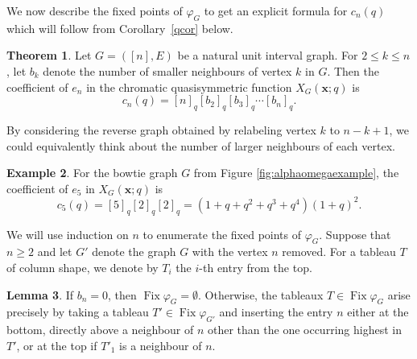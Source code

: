 \documentclass[10pt,a4paper]{amsart}
\theoremstyle{definition}
\newtheorem{theorem}{Theorem}[section]
\newtheorem{lemma}[theorem]{Lemma}
\newtheorem{example}[theorem]{Example}
\theoremstyle{remark}
\numberwithin{equation}{section}
\DeclareMathOperator{\Fix}{Fix}
\begin{document}
We now describe the fixed points of $\varphi_G$ to get an explicit formula for $c_n(q)$ which will follow from Corollary~\ref{qcor} below.


\begin{theorem}\label{thm:coefen}
Let $G=([n],E)$ be a natural unit interval graph. For $2\leq k\leq n$, let $b_k$ denote the number of smaller neighbours of vertex $k$ in $G$. Then the coefficient of $e_n$ in the chromatic quasisymmetric function $X_G(\bm x;q)$ is 
\begin{equation}
c_n(q)=[n]_q[b_2]_q[b_3]_q\cdots[b_n]_q.
\end{equation}
\end{theorem}

By considering the reverse graph obtained by relabeling vertex $k$ to $n-k+1$, we could equivalently think about the number of larger neighbours of each vertex. 

\begin{example}
For the bowtie graph $G$ from Figure \ref{fig:alphaomegaexample}, the coefficient of $e_5$ in $X_G(\bm x;q)$ is \begin{equation}
c_5(q)=[5]_q[2]_q[2]_q=(1+q+q^2+q^3+q^4)(1+q)^2.
\end{equation}
\end{example}

We will use induction on $n$ to enumerate the fixed points of $\varphi_G$. Suppose that $n\geq 2$ and let $G'$ denote the graph $G$ with the vertex $n$ removed. For a tableau $T$ of column shape, we denote by $T_i$ the $i$-th entry from the top.

\begin{lemma}\label{lem:fixind}
If $b_n=0$, then $\Fix\varphi_G=\emptyset$. Otherwise, the tableaux $T\in\Fix\varphi_G$ arise precisely by taking a tableau $T'\in\Fix\varphi_{G'}$ and inserting the entry $n$ either at the bottom, directly above a neighbour of $n$ other than the one occurring highest in $T'$, or at the top if $T'_1$ is a neighbour of $n$. 
\end{lemma}
\end{document}
